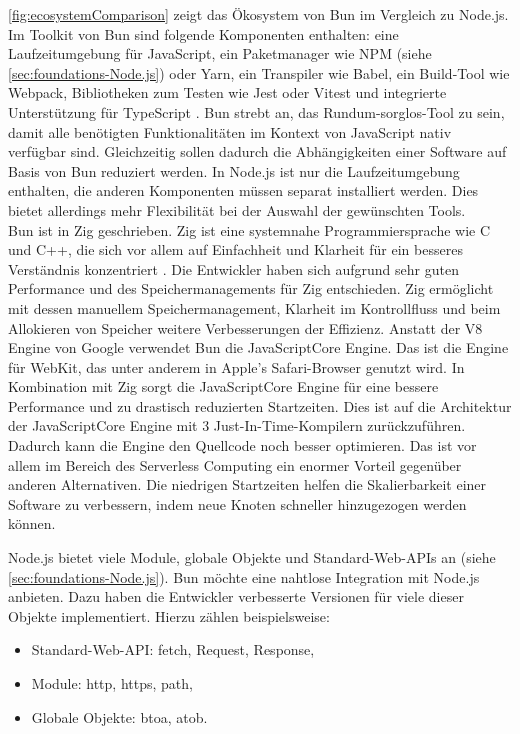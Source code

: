 \noindent
\autoref{fig:ecosystemComparison} zeigt das Ökosystem von Bun im Vergleich zu Node.js. Im Toolkit von Bun sind folgende Komponenten enthalten: eine Laufzeitumgebung für JavaScript, ein Paketmanager wie NPM (siehe \autoref{sec:foundations-Node.js}) oder Yarn, ein Transpiler wie Babel, ein Build-Tool wie Webpack, Bibliotheken zum Testen wie Jest oder Vitest und integrierte Unterstützung für TypeScript \cite{Sumner.2023c}. Bun strebt an, das Rundum-sorglos-Tool zu sein, damit alle benötigten Funktionalitäten im Kontext von JavaScript nativ verfügbar sind. Gleichzeitig sollen dadurch die Abhängigkeiten einer Software auf Basis von Bun reduziert werden. In Node.js ist nur die Laufzeitumgebung enthalten, die anderen Komponenten müssen separat installiert werden. Dies bietet allerdings mehr Flexibilität bei der Auswahl der gewünschten Tools.\cite{Springer.2022, Bun.}\\

\noindent
Bun ist in Zig geschrieben. Zig ist eine systemnahe Programmiersprache wie C und C++, die sich vor allem auf Einfachheit und Klarheit für ein besseres Verständnis konzentriert \cite{ZigSoftwareFoundation.o.J.}. Die Entwickler haben sich aufgrund sehr guten Performance und des Speichermanagements für Zig entschieden. Zig ermöglicht mit dessen manuellem Speichermanagement, Klarheit im Kontrollfluss und beim Allokieren von Speicher weitere Verbesserungen der Effizienz. Anstatt der V8 Engine von Google verwendet Bun die JavaScriptCore Engine. Das ist die Engine für WebKit, das unter anderem in Apple's Safari-Browser genutzt wird. In Kombination mit Zig sorgt die JavaScriptCore Engine für eine bessere Performance und zu drastisch reduzierten Startzeiten. Dies ist auf die Architektur der JavaScriptCore Engine mit 3 Just-In-Time-Kompilern zurückzuführen. Dadurch kann die Engine den Quellcode noch besser optimieren. Das ist vor allem im Bereich des Serverless Computing ein enormer Vorteil gegenüber anderen Alternativen. Die niedrigen Startzeiten helfen die Skalierbarkeit einer Software zu verbessern, indem neue Knoten schneller hinzugezogen werden können.\cite{OvenSh.2023c, OvenSh.2022, Apple.o.J., Apple.o.J.b, Silva.2020}

\noindent
Node.js bietet viele Module, globale Objekte und Standard-Web-APIs an (siehe \autoref{sec:foundations-Node.js}). Bun möchte eine nahtlose Integration mit Node.js anbieten. Dazu haben die Entwickler verbesserte Versionen für viele dieser Objekte implementiert. Hierzu zählen beispielsweise:
\begin{itemize}
	\item Standard-Web-API: fetch, Request, Response,
	\item Module: http, https, path,
	\item Globale Objekte: btoa, atob.\cite{OvenSh.2023c} 
\end{itemize} 

